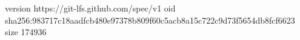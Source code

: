 version https://git-lfs.github.com/spec/v1
oid sha256:983717c18aadfcb480e97378b809f60c5acb8a15c722c9d73f5654db8fcf6623
size 174936

